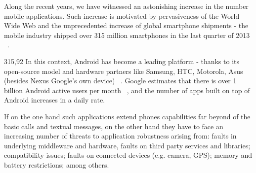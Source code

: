 \documentclass[conference]{IEEEtran}
\begin{document}
Along the recent years, we have witnessed an astonishing increase in the number 
mobile applications. Such increase is motivated by pervasiveness of the World Wide Web 
and the unprecedented increase of global smartphone shipments -
the mobile industry shipped over 315 million smartphones in the last quarter of 2013 ~\cite{googleio}.

315,92
In this context, Android has become a leading platform - thanks to its open-source 
model and hardware partners like Samsung, HTC, Motorola, Asus (besides Nexus Google's
 own device) ~\cite{gartner}.  Google estimates that there is over 1 billion Android active users per month ~\cite{googleio},
and the number of apps built on top of Android increases in a daily rate.





If on the one hand such applications extend phones capabilities 
far beyond of the basic calls and textual messages, on the other hand
they have to face an increasing number of threats to application robustness
 arising from: faults in underlying middleware and hardware, 
faults on third party services and libraries; compatibility issues; 
faults on connected devices (e.g. camera, GPS); memory and 
battery restrictions; among others.
\end{document}

